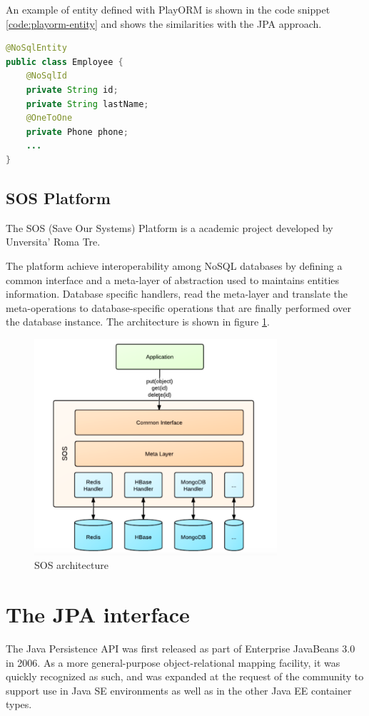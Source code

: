 \noindent An example of entity defined with PlayORM is shown in the code snippet \ref{code:playorm-entity} and shows the similarities with the JPA approach.

\begin{lstlisting}[language=Java, caption=PlayORM object mapping, label=code:playorm-entity]
@NoSqlEntity
public class Employee {
    @NoSqlId
    private String id;
    private String lastName;
    @OneToOne
    private Phone phone;
    ...
}
\end{lstlisting}

\subsection{SOS Platform}
The SOS (Save Our Systems) Platform \cite{paper:sos-platform} is a academic project developed by Unversita' Roma Tre.

\noindent The platform achieve interoperability among NoSQL databases by defining a common interface  and a meta-layer of abstraction used to maintains entities information. Database specific handlers, read the meta-layer and translate the meta-operations to database-specific operations that are finally performed over the database instance.
The architecture is shown in figure \ref{fig:sos-architecture}.

\begin{figure}[tbh]
  \centering
  \includegraphics[width=9cm]{images/sos_architecture}
  \caption{SOS architecture \cite{paper:sos-platform}}
  \label{fig:sos-architecture}
\end{figure}

\section{The JPA interface}
\label{sec:jpa}
The Java Persistence API \cite{book:projpa2} was first released as part of Enterprise JavaBeans 3.0 in 2006. As a more general-purpose object-relational mapping facility, it was quickly recognized as such, and was expanded at the request of the community to support use in Java SE environments as well as in the other Java EE container types.

